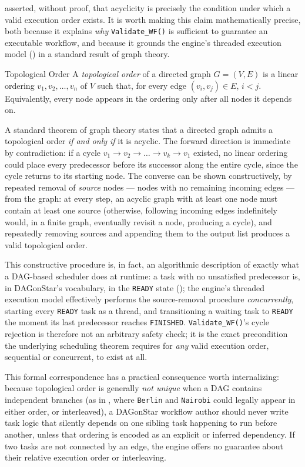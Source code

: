  asserted, without proof, that acyclicity is precisely
the condition under which a valid execution order exists. It is worth
making this claim mathematically precise, both because it explains
\emph{why} \texttt{Validate\_WF()} is sufficient to guarantee an executable
workflow, and because it grounds the engine's threaded execution model
() in a standard result of graph theory.

\begin{definitionbox}{Topological Order}
A \emph{topological order} of a directed graph $G=(V,E)$ is a linear
ordering $v_1, v_2, \dots, v_n$ of $V$ such that, for every edge
$(v_i, v_j) \in E$, $i < j$. Equivalently, every node appears in the
ordering only after all nodes it depends on.
\end{definitionbox}

A standard theorem of graph theory states that a directed graph admits a
topological order \emph{if and only if} it is acyclic. The forward direction
is immediate by contradiction: if a cycle $v_1 \to v_2 \to \dots \to v_k \to
v_1$ existed, no linear ordering could place every predecessor before its
successor along the entire cycle, since the cycle returns to its starting
node. The converse can be shown constructively, by repeated removal of
\emph{source} nodes --- nodes with no remaining incoming edges --- from the
graph: at every step, an acyclic graph with at least one node must contain
at least one source (otherwise, following incoming edges indefinitely would,
in a finite graph, eventually revisit a node, producing a cycle), and
repeatedly removing sources and appending them to the output list produces a
valid topological order.

This constructive procedure is, in fact, an algorithmic description of
exactly what a DAG-based scheduler does at runtime: a task with no
unsatisfied predecessor is, in DAGonStar's vocabulary, in the
\texttt{READY} state (); the engine's threaded
execution model effectively performs the source-removal procedure
\emph{concurrently}, starting every \texttt{READY} task as a thread, and
transitioning a waiting task to \texttt{READY} the moment its last
predecessor reaches \texttt{FINISHED}. \texttt{Validate\_WF()}'s cycle
rejection is therefore not an arbitrary safety check; it is the exact
precondition the underlying scheduling theorem requires for \emph{any}
valid execution order, sequential or concurrent, to exist at all.

\begin{practicebox}
This formal correspondence has a practical consequence worth internalizing:
because topological order is generally \emph{not unique} when a DAG contains
independent branches (as in , where \texttt{Berlin} and
\texttt{Nairobi} could legally appear in either order, or interleaved), a
DAGonStar workflow author should never write task logic that silently
depends on one sibling task happening to run before another, unless that
ordering is encoded as an explicit or inferred dependency. If two tasks are
not connected by an edge, the engine offers no guarantee about their
relative execution order or interleaving.
\end{practicebox}


